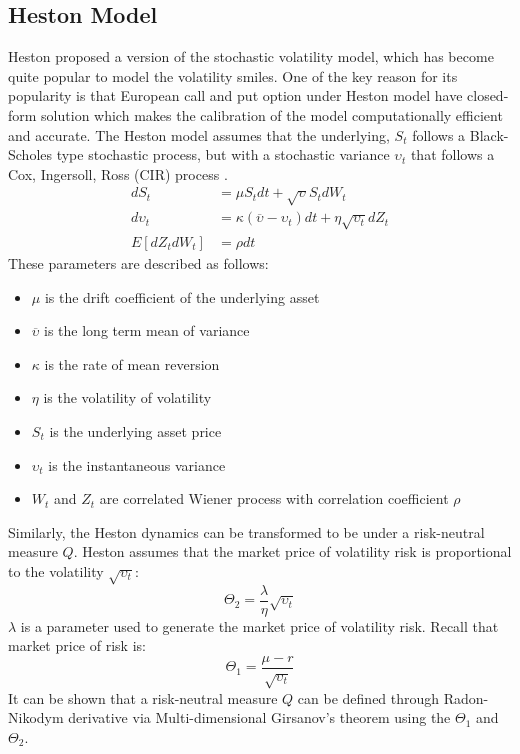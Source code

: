 \documentclass[letterpaper,12pt,titlepage,oneside,final]{book}
\numberwithin{equation}{section}
\theoremstyle{definition}
\begin{document}
\subsection{Heston Model}
Heston \cite{heston1993closed} proposed a version of the stochastic volatility model, which has become quite popular to model the volatility smiles. One of the key reason for its popularity is that European call and put option under Heston model have closed-form solution which makes the calibration of the model computationally efficient and accurate.
The Heston model assumes that the underlying, $S_t$ follows a Black-Scholes type stochastic process, but with a stochastic variance $\upsilon_t$ that follows a Cox, Ingersoll, Ross (CIR) process \cite{cox2005theory}.
\[
\begin{split}
dS_t&=\mu S_t dt + \sqrt{\upsilon} S_t dW_t\\
d\upsilon_t&=\kappa(\overline{\upsilon}-\upsilon_t)dt+\eta \sqrt{\upsilon_t}dZ_t\\
E[dZ_tdW_t]&=\rho dt
\end{split}
\]
These parameters are described as follows:
\begin{itemize}
  \item $\mu$ is the drift coefficient of the underlying asset
  \item $\overline{\upsilon}$ is the long term mean of variance
  \item $\kappa$ is the rate of mean reversion
  \item $\eta$ is the volatility of volatility
  \item $S_t$ is the underlying asset price
  \item $\upsilon_t$ is the  instantaneous variance
  \item $W_t$ and $Z_t$ are correlated Wiener process with correlation coefficient $\rho$
\end{itemize}
Similarly, the Heston dynamics can be transformed to be under a risk-neutral measure $Q$.
Heston \cite{heston1993closed} assumes that the market price of volatility risk is  proportional to the volatility $\sqrt{\upsilon_t}$:
\begin{equation}
\Theta_{2}=\frac{\lambda}{\eta} \sqrt{\upsilon_t}
\label{eq:price-vol-risk}
\end{equation}
$\lambda$ is a parameter used to generate the market price of volatility risk.
Recall that market price of risk is:
\[
\Theta_1=\frac{\mu-r}{\sqrt{\upsilon_t}}
\]
It can be shown that a risk-neutral measure $Q$ can be defined through Radon-Nikodym derivative via Multi-dimensional Girsanov's theorem \cite{shreve2004stochastic} using the $\Theta_1$ and $\Theta_2$.
\end{document}
